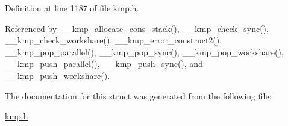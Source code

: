 Definition at line 1187 of file kmp.\-h.



Referenced by \-\_\-\-\_\-kmp\-\_\-allocate\-\_\-cons\-\_\-stack(), \-\_\-\-\_\-kmp\-\_\-check\-\_\-sync(), \-\_\-\-\_\-kmp\-\_\-check\-\_\-workshare(), \-\_\-\-\_\-kmp\-\_\-error\-\_\-construct2(), \-\_\-\-\_\-kmp\-\_\-pop\-\_\-parallel(), \-\_\-\-\_\-kmp\-\_\-pop\-\_\-sync(), \-\_\-\-\_\-kmp\-\_\-pop\-\_\-workshare(), \-\_\-\-\_\-kmp\-\_\-push\-\_\-parallel(), \-\_\-\-\_\-kmp\-\_\-push\-\_\-sync(), and \-\_\-\-\_\-kmp\-\_\-push\-\_\-workshare().



The documentation for this struct was generated from the following file\-:\begin{DoxyCompactItemize}
\item 
\hyperlink{kmp_8h}{kmp.\-h}\end{DoxyCompactItemize}
